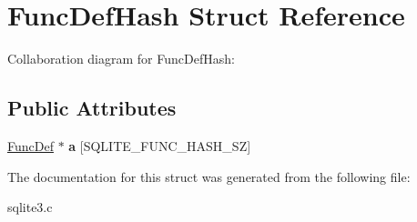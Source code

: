 \hypertarget{structFuncDefHash}{}\section{Func\+Def\+Hash Struct Reference}
\label{structFuncDefHash}


Collaboration diagram for Func\+Def\+Hash\+:
\subsection*{Public Attributes}
\begin{DoxyCompactItemize}
\item 
\hyperlink{structFuncDef}{Func\+Def} $\ast$ {\bfseries a} \mbox{[}S\+Q\+L\+I\+T\+E\+\_\+\+F\+U\+N\+C\+\_\+\+H\+A\+S\+H\+\_\+\+SZ\mbox{]}\hypertarget{structFuncDefHash_aaab2cd9c5f40d92c236f8fdeb2d9849a}{}\label{structFuncDefHash_aaab2cd9c5f40d92c236f8fdeb2d9849a}

\end{DoxyCompactItemize}


The documentation for this struct was generated from the following file\+:\begin{DoxyCompactItemize}
\item 
sqlite3.\+c\end{DoxyCompactItemize}
